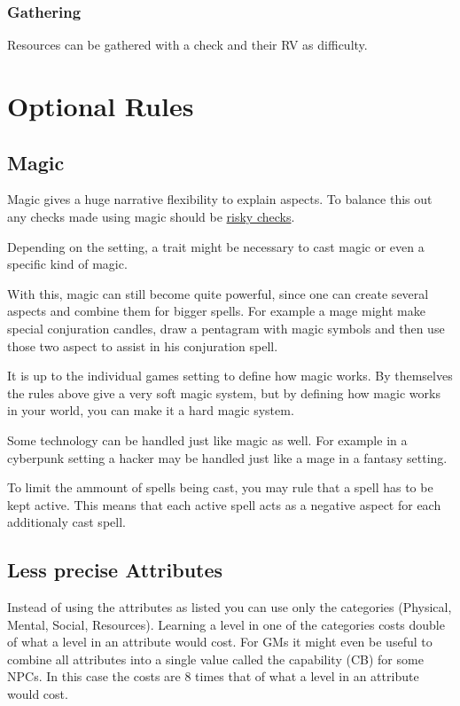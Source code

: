 \documentclass[11pt]{article}
\begin{document}
{\subsubsection{Gathering}
\label{sec:orgbce852e}
Resources can be gathered with a check and their RV as difficulty.
\section{Optional Rules}
\label{sec:org98b6601}
\subsection{Magic}
\label{sec:orgd708b78}

Magic gives a huge narrative flexibility to explain aspects. To balance this out any checks made using magic should be \hyperref[sec:orgdb86fca]{risky checks}.

Depending on the setting, a trait might be necessary to cast magic or even a specific kind of magic.

With this, magic can still become quite powerful, since one can create several aspects and combine them for bigger spells. For example a mage might make special conjuration candles, draw a pentagram with magic symbols and then use those two aspect to assist in his conjuration spell.

It is up to the individual games setting to define how magic works. By themselves the rules above give a very soft magic system, but by defining how magic works in your world, you can make it a hard magic system.

Some technology can be handled just like magic as well. For example in a cyberpunk setting a hacker may be handled just like a mage in a fantasy setting.

To limit the ammount of spells being cast, you may rule that a spell has to be kept active. This means that each active spell acts as a negative aspect for each additionaly cast spell. 
\subsection{Less precise Attributes}
\label{sec:org7960fac}
Instead of using the attributes as listed you can use only the categories (Physical, Mental, Social, Resources). Learning a level in one of the categories costs double of what a level in an attribute would cost.
For GMs it might even be useful to combine all attributes into a single value called the capability (CB) for some NPCs. In this case the costs are 8 times that of what a level in an attribute would cost.
}
\end{document}
